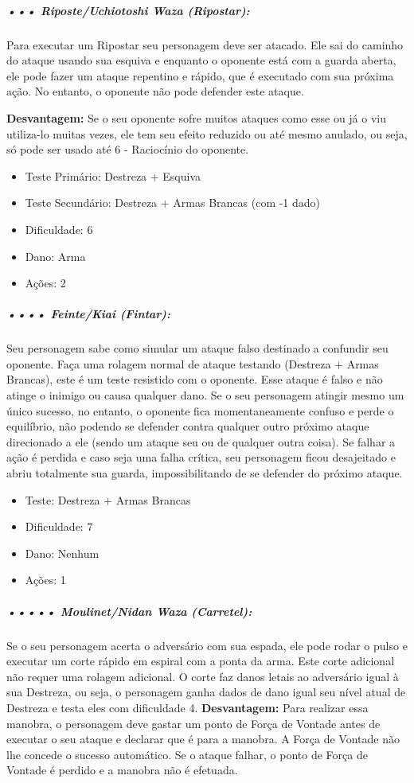 \subparagraph{\bf ••• Riposte/Uchiotoshi Waza (Ripostar):}
Para executar um Ripostar seu personagem deve ser atacado. Ele sai do caminho do ataque usando sua esquiva e enquanto o oponente está com a guarda aberta, ele pode fazer um ataque repentino e rápido, que é executado com sua próxima ação. No entanto, o oponente não pode defender este ataque.

{\bf Desvantagem:} Se o seu oponente sofre muitos ataques como esse ou já o viu utiliza-lo muitas vezes, ele tem seu efeito reduzido ou até mesmo anulado, ou seja, só pode ser usado até 6 - Raciocínio do oponente.
\begin{itemize}[noitemsep]
\item Teste Primário: Destreza + Esquiva
\item Teste Secundário: Destreza + Armas Brancas (com -1 dado)
\item Dificuldade: 6
\item Dano: Arma
\item Ações: 2
\end{itemize}

\subparagraph{\bf •••• Feinte/Kiai (Fintar):} 
Seu personagem sabe como simular um ataque falso destinado a confundir seu oponente. Faça uma rolagem normal de ataque testando (Destreza + Armas Brancas), este é um teste resistido com o oponente. Esse ataque é falso e não atinge o inimigo ou causa qualquer dano. Se o seu personagem atingir mesmo um único sucesso, no entanto, o oponente fica momentaneamente confuso e perde o equilíbrio, não podendo se defender contra qualquer outro próximo ataque direcionado a ele (sendo um ataque seu ou de qualquer outra coisa). Se falhar a ação é perdida e caso seja uma falha crítica, seu personagem ficou desajeitado e abriu totalmente sua guarda, impossibilitando de se defender do próximo ataque.
\begin{itemize}[noitemsep]
\item Teste: Destreza + Armas Brancas
\item Dificuldade: 7
\item Dano: Nenhum
\item Ações: 1
\end{itemize}

\subparagraph{\bf ••••• Moulinet/Nidan Waza (Carretel):}
Se o seu personagem acerta o adversário com sua espada, ele pode rodar o pulso e executar um corte rápido em espiral com a ponta da arma. Este corte adicional não requer uma rolagem adicional. O corte faz danos letais ao adversário igual à sua Destreza, ou seja, o personagem ganha dados de dano igual seu nível atual de Destreza e testa eles com dificuldade 4.
{\bf Desvantagem:} Para realizar essa manobra, o personagem deve gastar um ponto de Força de Vontade antes de executar o seu ataque e declarar que é para a manobra. A Força de Vontade não lhe concede o sucesso automático. Se o ataque falhar, o ponto de Força de Vontade é perdido e a manobra não é efetuada.